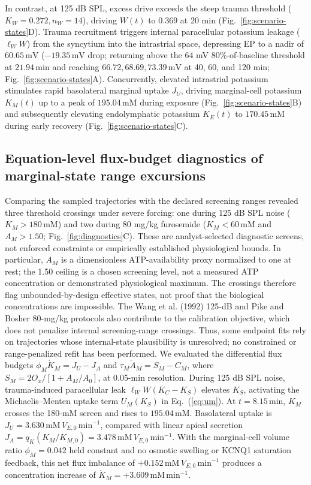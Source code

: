 \documentclass[final,5p,times]{elsarticle}
\begin{document}
In contrast, at 125 dB SPL, excess drive exceeds the steep trauma threshold (\(K_W = 0.272, n_W = 14\)), driving \(W(t)\) to \(0.369\) at 20 min (Fig.~\ref{fig:scenario-states}D). Trauma recruitment triggers internal paracellular potassium leakage (\(\ell_W W\)) from the syncytium into the intrastrial space, depressing EP to a nadir of \(60.65\,\mathrm{mV}\) (\(-19.35\,\mathrm{mV}\) drop; returning above the 64 mV 80\%-of-baseline threshold at \(21.94\,\mathrm{min}\) and reaching \(66.72, 68.69, 73.39\,\mathrm{mV}\) at 40, 60, and 120 min; Fig.~\ref{fig:scenario-states}A). Concurrently, elevated intrastrial potassium stimulates rapid basolateral marginal uptake \(J_U\), driving marginal-cell potassium \(K_M(t)\) up to a peak of \(195.04\,\mathrm{mM}\) during exposure (Fig.~\ref{fig:scenario-states}B) and subsequently elevating endolymphatic potassium \(K_E(t)\) to \(170.45\,\mathrm{mM}\) during early recovery (Fig.~\ref{fig:scenario-states}C).

\subsection{Equation-level flux-budget diagnostics of marginal-state range excursions}\label{sec:stability-flux-budgets}

Comparing the sampled trajectories with the declared screening ranges revealed three threshold crossings under severe forcing: one during 125 dB SPL noise (\(K_M > 180\,\mathrm{mM}\)) and two during 80 mg/kg furosemide (\(K_M < 60\,\mathrm{mM}\) and \(A_M > 1.50\); Fig.~\ref{fig:diagnostics}C). These are analyst-selected diagnostic screens, not enforced constraints or empirically established physiological bounds. In particular, \(A_M\) is a dimensionless ATP-availability proxy normalized to one at rest; the 1.50 ceiling is a chosen screening level, not a measured ATP concentration or demonstrated physiological maximum. The crossings therefore flag unbounded-by-design effective states, not proof that the biological concentrations are impossible. The Wang et al. (1992) 125-dB and Pike and Bosher 80-mg/kg protocols also contribute to the calibration objective, which does not penalize internal screening-range crossings. Thus, some endpoint fits rely on trajectories whose internal-state plausibility is unresolved; no constrained or range-penalized refit has been performed. We evaluated the differential flux budgets \(\phi_M \dot{K}_M = J_U - J_A\) and \(\tau_M \dot{A}_M = S_M - C_M\), where \(S_M = 2O_x/[1 + A_M/A_0]\), at 0.05-min resolution. During 125 dB SPL noise, trauma-induced paracellular leak \(\ell_W W(K_C - K_S)\) elevates \(K_S\), activating the Michaelis--Menten uptake term \(U_M(K_S)\) in Eq.~(\ref{eq:um}). At \(t=8.15\,\mathrm{min}\), \(K_M\) crosses the 180-mM screen and rises to \(195.04\,\mathrm{mM}\). Basolateral uptake is \(J_U=3.630\,\mathrm{mM}\,V_{E,0}\,\mathrm{min}^{-1}\), compared with linear apical secretion \(J_A=q_K(K_M/K_{M,0})=3.478\,\mathrm{mM}\,V_{E,0}\,\mathrm{min}^{-1}\). With the marginal-cell volume ratio \(\phi_M=0.042\) held constant and no osmotic swelling or KCNQ1 saturation feedback, this net flux imbalance of \(+0.152\,\mathrm{mM}\,V_{E,0}\,\mathrm{min}^{-1}\) produces a concentration increase of \(\dot{K}_M=+3.609\,\mathrm{mM}\,\mathrm{min}^{-1}\).
\end{document}
